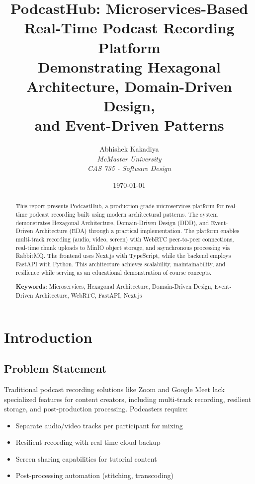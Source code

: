 \documentclass[12pt,a4paper]{article}
\title{
    \textbf{PodcastHub: Microservices-Based \\Real-Time Podcast Recording Platform}\\
    \vspace{0.3cm}
    \large{Demonstrating Hexagonal Architecture, Domain-Driven Design,\\
    and Event-Driven Patterns}
}
\author{
    Abhishek Kakadiya\\
    \textit{McMaster University}\\
    \textit{CAS 735 - Software Design}
}
\date{\today}
\begin{document}
\maketitle

\begin{abstract}
\noindent
This report presents PodcastHub, a production-grade microservices platform for real-time podcast recording built using modern architectural patterns. The system demonstrates Hexagonal Architecture, Domain-Driven Design (DDD), and Event-Driven Architecture (EDA) through a practical implementation. The platform enables multi-track recording (audio, video, screen) with WebRTC peer-to-peer connections, real-time chunk uploads to MinIO object storage, and asynchronous processing via RabbitMQ. The frontend uses Next.js with TypeScript, while the backend employs FastAPI with Python. This architecture achieves scalability, maintainability, and resilience while serving as an educational demonstration of course concepts.

\vspace{0.3cm}
\noindent
\textbf{Keywords:} Microservices, Hexagonal Architecture, Domain-Driven Design, Event-Driven Architecture, WebRTC, FastAPI, Next.js
\end{abstract}

\tableofcontents
\newpage

\section{Introduction}

\subsection{Problem Statement}
Traditional podcast recording solutions like Zoom and Google Meet lack specialized features for content creators, including multi-track recording, resilient storage, and post-production processing. Podcasters require:
\begin{itemize}[noitemsep]
    \item Separate audio/video tracks per participant for mixing
    \item Resilient recording with real-time cloud backup
    \item Screen sharing capabilities for tutorial content
    \item Post-processing automation (stitching, transcoding)
\end{itemize}
\end{document}
